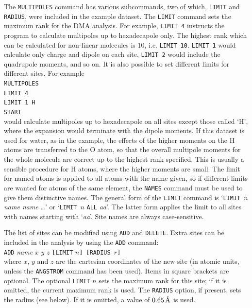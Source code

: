 \documentclass[12pt,txfonts]{paper}
\let\ring=\r
\newcommand{\angstrom}{\unskip\ensuremath{\,\hbox{\ring A}}}
\begin{document}
The \verb/MULTIPOLES/ command has various subcommands, two of which,
\verb/LIMIT/ and \verb/RADIUS/, were included in the example dataset.
The \verb/LIMIT/ command sets the maximum rank 
for the DMA analysis. For example, \verb/LIMIT 4/ instructs the
program to calculate multipoles up to hexadecapole only. The highest rank
which can be calculated for non-linear molecules is 10, i.e.
\verb/LIMIT 10/.
\verb/LIMIT 1/ would calculate only charge and dipole on each site, 
\verb/LIMIT 2/ would include the quadrupole moments, and so on.
It is also possible
to set different limits for different sites. For example\\
\hspace*{2 em}\verb/MULTIPOLES/\\
\hspace*{2 em}\verb/LIMIT 4/\\
\hspace*{2 em}\verb/LIMIT 1 H/\\
\hspace*{2 em}\verb/START/\\
would calculate multipoles up to hexadecapole on all sites except
those called `H', where the expansion would terminate with the dipole
moments. If this dataset is used for water, as in the example, the
effects of the higher 
moments on the H atoms are transferred to the O atom, so that the
overall multipole moments for the whole molecule are correct up to the
highest rank specified. This is usually a sensible procedure for H
atoms, where the higher moments are small. The limit for named atoms
is applied to all atoms with the name given, so if different limits
are wanted for atoms of the same element, the \verb/NAMES/ command
must be used to give them distinctive names. The general form of the
\verb/LIMIT/ command is `\verb/LIMIT /$n$ \emph{name name }\dots' or
`\verb/LIMIT /$n$ \verb/ALL/ \emph{aa}'. The latter form applies the
limit to all sites with names starting with `\emph{aa}'. Site names
are always case-sensitive.

The list of sites can be modified using \verb/ADD/ and \verb/DELETE/.
Extra sites can be included in the analysis by using the \verb/ADD/
command:\\
\hspace*{2 em}\verb/ADD/ \emph{name} $x$ $y$ $z$ \verb/[LIMIT/ $n$\verb/] [RADIUS /$r$\verb/]/\\
where $x$, $y$ and $z$ are the cartesian coordinates of the new site
(in atomic units, unless the \verb+ANGSTROM+ command has been used).
Items in square brackets are optional.
The optional \verb+LIMIT+ $n$ sets the maximum rank for this site; if
it is omitted, the current maximum rank is used.
The \verb+RADIUS+ option, if present, sets the radius (see below). If
it is omitted, a value of $0.65\angstrom$ is used.
\end{document}
